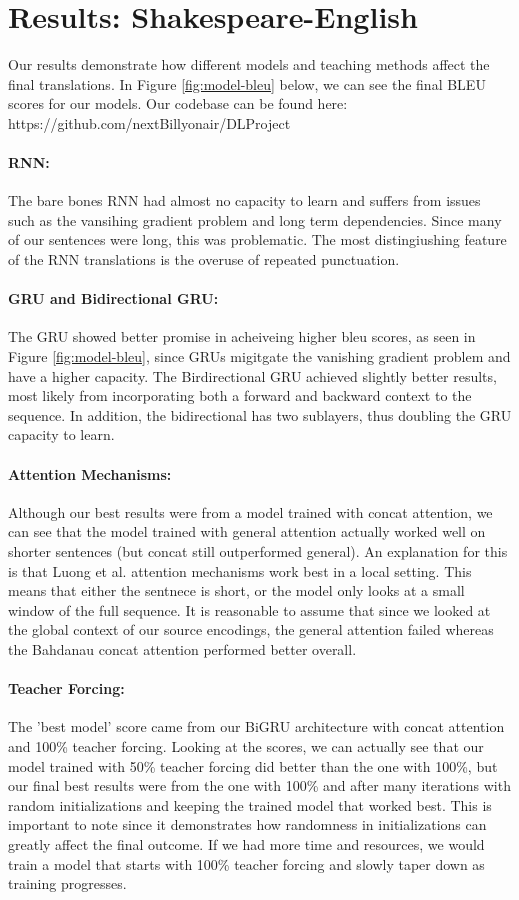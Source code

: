 \documentclass[twoside,twocolumn]{article}
\begin{document}
\section{Results: Shakespeare-English}
\label{sec:results}
Our results demonstrate how different models and teaching methods affect the
final translations. In Figure \ref{fig:model-bleu} below, we can see the
final BLEU scores for our models. Our codebase can be found here: 
https://github.com/nextBillyonair/DLProject
\paragraph{RNN:}
The bare bones RNN had almost no capacity to learn and suffers from issues
such as the vansihing gradient problem and long term dependencies. Since many
of our sentences were long, this was problematic. The most distingiushing
feature of the RNN translations is the overuse of repeated punctuation.
\paragraph{GRU and Bidirectional GRU:}
The GRU showed better promise in acheiveing higher bleu scores, as seen in
Figure \ref{fig:model-bleu}, since GRUs migitgate the vanishing gradient
problem and have a higher capacity.
The Birdirectional GRU achieved slightly better results, most likely from
incorporating both a forward and backward context to the sequence. In addition,
the bidirectional has two sublayers, thus doubling the GRU capacity to learn.
\paragraph{Attention Mechanisms:}
Although our best results were from a model trained with concat attention, we
can see that the model trained with general attention actually worked well on
shorter sentences (but concat still outperformed general).
An explanation for this is that Luong et al.
\cite{luong2015effective} attention mechanisms work best in a local setting.
This means that either the sentnece is short, or the model only looks at a
small window of the full sequence. It is reasonable to assume that since we
looked at the global context of our source encodings, the general attention
failed whereas the Bahdanau \cite{bahdanau2014neural} concat attention
performed better overall.
\paragraph{Teacher Forcing:}
The 'best model' score came from our BiGRU architecture with concat attention
and 100\% teacher forcing. Looking at the scores, we can actually see that our
model trained with 50\% teacher forcing did better than the one with 100\%, but
our final best results were from the one with 100\% and after many iterations
with random initializations and keeping the trained model that worked best.
This is important to note since it demonstrates how randomness in
initializations can greatly affect the final outcome. If we had more time and
resources, we would train a model that starts with 100\% teacher forcing and
slowly taper down as training progresses.
\end{document}
